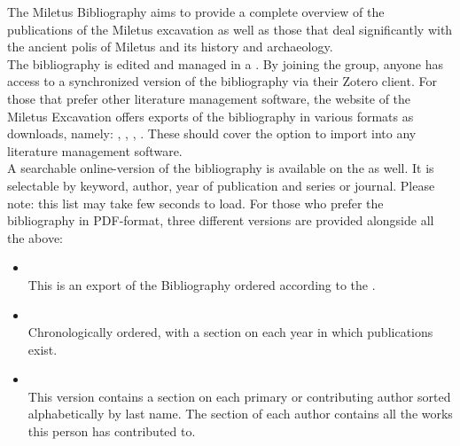 \documentclass[a4paper]{scrartcl}
\newcommand{\redhref}[2]{\href{#1}{\color{uhhred}{#2}}}
\begin{document}


The Miletus Bibliography aims to provide a complete overview of the publications of the Miletus excavation as well as those that deal significantly with the ancient polis of Miletus and its history and archaeology.\\

The bibliography is edited and managed in a \redhref{https://www.zotero.org/groups/4475959/milet_bibliography}{publicly accessible Zotero group library}. By joining the group, anyone has access to a synchronized version of the bibliography via their Zotero client. For those that prefer other literature management software, the website of the Miletus Excavation offers exports of the bibliography in various formats as downloads, namely: \redhref{https://raw.github.com/lsteinmann/Miletus_Bibliography/main/data/Milet_Bibliography_BibLaTeX.bib}{BibLaTeX}, \redhref{https://raw.github.com/lsteinmann/Miletus_Bibliography/main/data/Milet_Bibliography_BibTeX.bib}{BibTeX}, \redhref{https://raw.github.com/lsteinmann/Miletus_Bibliography/main/data/Milet_Bibliography_CSV.csv}{CSV}, \redhref{https://raw.github.com/lsteinmann/Miletus_Bibliography/main/data/Milet_Bibliography_RIS.ris}{RIS}. These should cover the option to import into any literature management software.\\

A searchable online-version of the bibliography is available on the \redhref{https://www.miletgrabung.uni-hamburg.de/material/bibliographie.html}{homepage of the Miletus Excavation} as well. It is selectable by keyword, author, year of publication and series or journal. Please note: this list may take few seconds to load. For those who prefer the bibliography in PDF-format, three different versions are provided alongside all the above: 

\begin{itemize}
    \item \redhref{https://raw.github.com/lsteinmann/Miletus_Bibliography/main/out/pdf/milet-bibliographie-by-tag-pdf.pdf}{Milet-Bibliographie, by keyword (PDF)}\\
    This is an export of the Bibliography ordered according to the \redhref{https://www.miletgrabung.uni-hamburg.de/en/material/bibliographie/bib-tags.html}{System of Keywords}.
    \item \redhref{https://raw.github.com/lsteinmann/Miletus_Bibliography/main/out/pdf/milet-bibliographie-by-year-pdf.pdf}{Milet-Bibliographie, chronological (PDF)}\\
    Chronologically ordered, with a section on each year in which publications exist. 
    \item \redhref{https://raw.github.com/lsteinmann/Miletus_Bibliography/main/out/pdf/milet-bibliographie-by-author-pdf.pdf}{Milet-Bibliographie, by author (PDF)}\\
    This version contains a section on each primary or contributing author sorted alphabetically by last name. The section of each author contains all the works this person has contributed to. 
\end{itemize}
\end{document}

